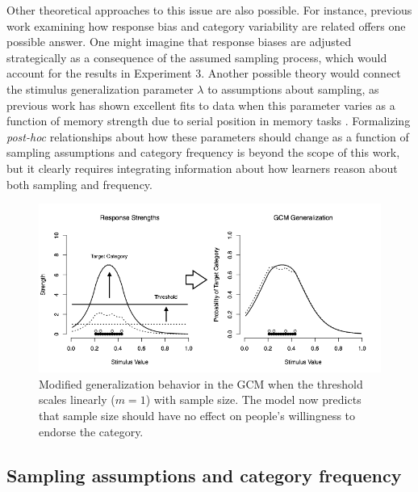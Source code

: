 \documentclass[doc,apacite]{apa6}
\begin{document}
Other theoretical approaches to this issue are also possible. For instance, previous work examining how response bias and category variability are related \cite{cohen2001category} offers one possible answer. One might imagine that response biases are adjusted strategically as a consequence of the assumed sampling process, which would account for the results in Experiment 3. Another possible theory would connect the stimulus generalization parameter $\lambda$ to assumptions about sampling, as previous work has shown excellent fits to data when this parameter varies as a function of memory strength due to serial position in memory tasks \cite{donkin2012power,nosofsky2011short}.
Formalizing \textit{post-hoc} relationships about how these parameters should change as a function of sampling assumptions and category frequency is beyond the scope of this work, but it clearly requires integrating information about how learners reason about both sampling and frequency.

\begin{figure}[t]
\begin{center}
\includegraphics[scale=.5]{figures/modifiedGCM.png}
\caption{Modified generalization behavior in the GCM when the threshold scales linearly ($m = 1$) with sample size. The model now predicts that sample size should have no effect on people's willingness to endorse the category.}
\label{fig:gcmExample3}
\end{center}
\end{figure}




\subsection{Sampling assumptions and category frequency}
\end{document}

